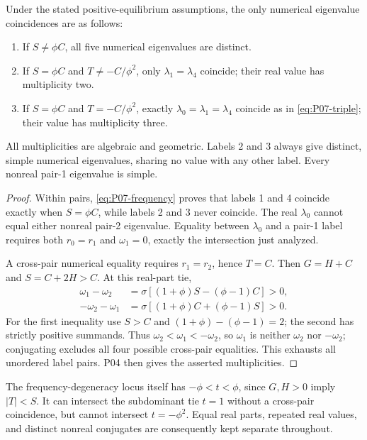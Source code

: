 \begin{proposition}
\label{prop:P07-coincidences}
Under the stated positive-equilibrium assumptions, the only numerical
 eigenvalue coincidences are as follows:
\begin{enumerate}[label=(\roman*),leftmargin=*]
\item If $S\ne\phi C$, all five numerical eigenvalues are distinct.
\item If $S=\phi C$ and $T\ne-C/\phi^2$, only
$\lambda_1=\lambda_4$ coincide; their real value has multiplicity two.
\item If $S=\phi C$ and $T=-C/\phi^2$, exactly
$\lambda_0=\lambda_1=\lambda_4$ coincide as in
\eqref{eq:P07-triple}; their value has multiplicity three.
\end{enumerate}
All multiplicities are algebraic and geometric. Labels 2 and 3 always
give distinct, simple numerical eigenvalues, sharing no value with any
other label. Every nonreal pair-1 eigenvalue is simple.
\end{proposition}
\begin{proof}
Within pairs, \eqref{eq:P07-frequency} proves that labels 1 and 4
coincide exactly when $S=\phi C$, while labels 2 and 3 never coincide.
The real $\lambda_0$ cannot equal either nonreal pair-2 eigenvalue.
Equality between $\lambda_0$ and a pair-1 label requires both
$r_0=r_1$ and $\omega_1=0$, exactly the intersection just analyzed.

A cross-pair numerical equality requires $r_1=r_2$, hence $T=C$.
Then $G=H+C$ and $S=C+2H>C$. At this real-part tie,
\begin{align*}
 \omega_1-\omega_2
    &=\sigma[(1+\phi)S-(\phi-1)C]>0,\\
 -\omega_2-\omega_1
    &=\sigma[(1+\phi)C+(\phi-1)S]>0.
\end{align*}
For the first inequality use $S>C$ and
$(1+\phi)-(\phi-1)=2$; the second has strictly positive summands.
Thus $\omega_2<\omega_1<-\omega_2$, so
$\omega_1$ is neither $\omega_2$ nor $-\omega_2$; conjugating
excludes all four possible cross-pair equalities. This exhausts all
unordered label pairs. P04 then gives the asserted multiplicities.
\end{proof}
The frequency-degeneracy locus itself has $-\phi<t<\phi$, since
$G,H>0$ imply $|T|<S$. It can intersect the subdominant tie $t=1$
without a cross-pair coincidence, but cannot intersect $t=-\phi^2$.
Equal real parts, repeated real values, and distinct nonreal conjugates
are consequently kept separate throughout.

